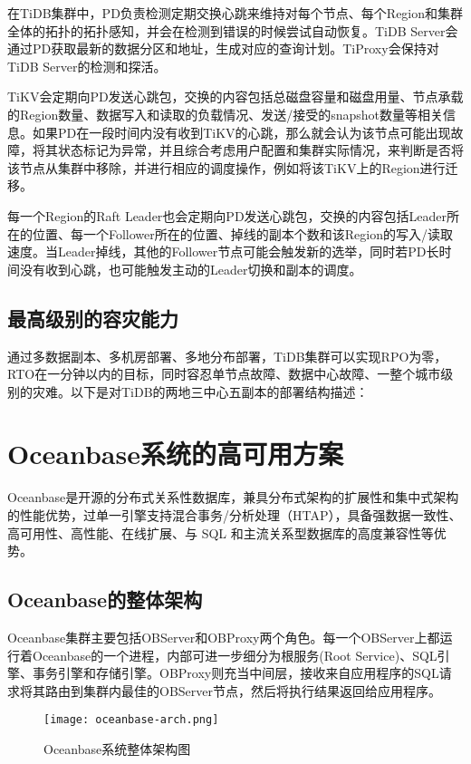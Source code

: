 在TiDB集群中，PD负责检测定期交换心跳来维持对每个节点、每个Region和集群全体的拓扑的拓扑感知，并会在检测到错误的时候尝试自动恢复。TiDB Server会通过PD获取最新的数据分区和地址，生成对应的查询计划。TiProxy会保持对TiDB Server的检测和探活。

TiKV会定期向PD发送心跳包，交换的内容包括总磁盘容量和磁盘用量、节点承载的Region数量、数据写入和读取的负载情况、发送/接受的snapshot数量等相关信息。如果PD在一段时间内没有收到TiKV的心跳，那么就会认为该节点可能出现故障，将其状态标记为异常，并且综合考虑用户配置和集群实际情况，来判断是否将该节点从集群中移除，并进行相应的调度操作，例如将该TiKV上的Region进行迁移。

每一个Region的Raft Leader也会定期向PD发送心跳包，交换的内容包括Leader所在的位置、每一个Follower所在的位置、掉线的副本个数和该Region的写入/读取速度。当Leader掉线，其他的Follower节点可能会触发新的选举，同时若PD长时间没有收到心跳，也可能触发主动的Leader切换和副本的调度。

\subsection{最高级别的容灾能力}

通过多数据副本、多机房部署、多地分布部署，TiDB集群可以实现RPO为零，RTO在一分钟以内的目标，同时容忍单节点故障、数据中心故障、一整个城市级别的灾难。以下是对TiDB的两地三中心五副本的部署结构描述：




\section{Oceanbase系统的高可用方案}

Oceanbase是开源的分布式关系性数据库，兼具分布式架构的扩展性和集中式架构的性能优势，过单一引擎支持混合事务/分析处理（HTAP），具备强数据一致性、高可用性、高性能、在线扩展、与 SQL 和主流关系型数据库的高度兼容性等优势。

\subsection{Oceanbase的整体架构}

Oceanbase集群主要包括OBServer和OBProxy两个角色。每一个OBServer上都运行着Oceanbase的一个进程，内部可进一步细分为根服务(Root Service)、SQL引擎、事务引擎和存储引擎。OBProxy则充当中间层，接收来自应用程序的SQL请求将其路由到集群内最佳的OBServer节点，然后将执行结果返回给应用程序。

\begin{figure}
  \centering
  \texttt{[image: oceanbase-arch.png]}
  \caption{Oceanbase系统整体架构图}
  \label{fig:oceanbase-arch}
\end{figure}

